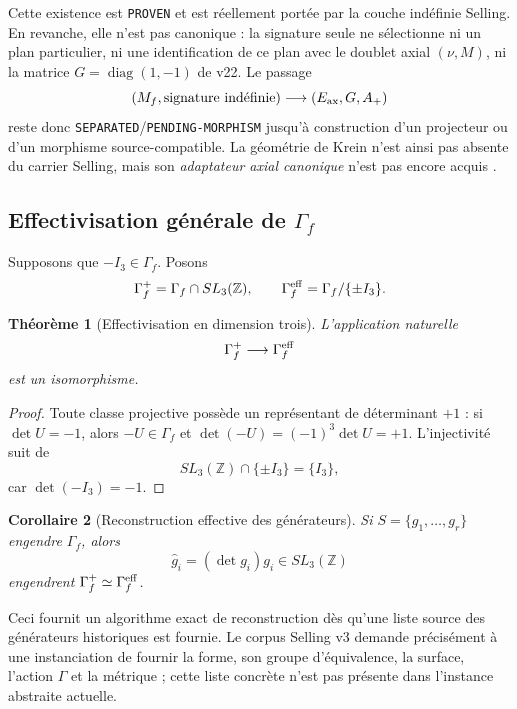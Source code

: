 \documentclass[11pt,a4paper]{article}
\newtheorem{theorem}{Théorème}[section]
\newtheorem{corollary}[theorem]{Corollaire}
\newcommand{\Z}{\mathbb Z}
\newcommand{\certProven}{\texttt{PROVEN}}
\newcommand{\certSeparated}{\texttt{SEPARATED}}
\newcommand{\certPending}{\texttt{PENDING-MORPHISM}}
\begin{document}
Cette existence est \certProven{} et est réellement portée par la couche indéfinie Selling. En revanche, elle n'est pas canonique : la signature seule ne sélectionne ni un plan particulier, ni une identification de ce plan avec le doublet axial $(\nu,M)$, ni la matrice $G=\operatorname{diag}(1,-1)$ de v22. Le passage
\[
 (M_f,\text{signature indéfinie})
 \longrightarrow
 (E_{\rm ax},G,A_+)
\]
reste donc \certSeparated{}/\certPending{} jusqu'à construction d'un projecteur ou d'un morphisme source-compatible. La géométrie de Krein n'est ainsi pas absente du carrier Selling, mais son \emph{adaptateur axial canonique} n'est pas encore acquis \cite{Bognar1974}.

\subsection{Effectivisation générale de \texorpdfstring{$\Gamma_f$}{Gammaf}}

Supposons que $-I_3\in\Gamma_f$. Posons
\[
 \Gamma_f^+=\Gamma_f\cap SL_3(\Z),
 \qquad
 \Gamma_f^{\rm eff}=\Gamma_f/\{\pm I_3\}.
\]

\begin{theorem}[Effectivisation en dimension trois]\label{thm:v23-effective-isomorphism}
L'application naturelle
\[
 \Gamma_f^+\longrightarrow\Gamma_f^{\rm eff}
\]
est un isomorphisme.
\end{theorem}

\begin{proof}
Toute classe projective possède un représentant de déterminant $+1$ : si $\det U=-1$, alors $-U\in\Gamma_f$ et $\det(-U)=(-1)^3\det U=+1$. L'injectivité suit de
\[
 SL_3(\Z)\cap\{\pm I_3\}=\{I_3\},
\]
car $\det(-I_3)=-1$.
\end{proof}

\begin{corollary}[Reconstruction effective des générateurs]\label{cor:v23-effective-generators}
Si $S=\{g_1,\ldots,g_r\}$ engendre $\Gamma_f$, alors
\begin{equation}\label{eq:v23-normalized-generators}
 \boxed{\widehat g_i=(\det g_i)g_i\in SL_3(\Z)}
\end{equation}
engendrent $\Gamma_f^+\simeq\Gamma_f^{\rm eff}$.
\end{corollary}

Ceci fournit un algorithme exact de reconstruction dès qu'une liste source des générateurs historiques est fournie. Le corpus Selling v3 demande précisément à une instanciation de fournir la forme, son groupe d'équivalence, la surface, l'action $\Gamma$ et la métrique \cite{SellingHTNT}; cette liste concrète n'est pas présente dans l'instance abstraite actuelle.
\end{document}
